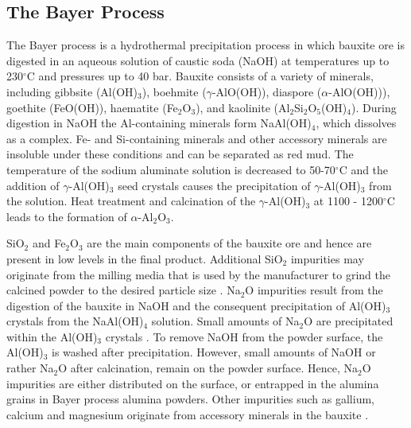 \subsection{The Bayer Process}

The Bayer process is a hydrothermal precipitation process in which bauxite ore is digested in an aqueous solution of caustic soda (NaOH) at temperatures up to 230$^{\circ}$C and pressures up to 40 bar. Bauxite consists of a variety of minerals, including gibbsite (Al(OH)$_{3}$), boehmite ($\gamma$-AlO(OH)), diaspore ($\alpha$-AlO(OH))), goethite (FeO(OH)), haematite (Fe$_{2}$O$_{3}$), and kaolinite (Al$_{2}$Si$_{2}$O$_{5}$(OH)$_{4}$). During digestion in NaOH the Al-containing minerals form NaAl(OH)$_{4}$, which dissolves as a complex. Fe- and Si-containing minerals and other accessory minerals are insoluble under these conditions and can be separated as red mud. The temperature of the sodium aluminate solution is decreased to 50-70$^{\circ}$C and the addition of $\gamma$-Al(OH)$_{3}$ seed crystals causes the precipitation of $\gamma$-Al(OH)$_{3}$ from the solution. Heat treatment and calcination of the $\gamma$-Al(OH)$_{3}$ at 1100 - 1200$^{\circ}$C leads to the formation of $\alpha$-Al$_{2}$O$_{3}$.

SiO$_{2}$ and Fe$_{2}$O$_{3}$ are the main components of the bauxite ore and hence are present in low levels in the final product. Additional SiO$_{2}$ impurities may originate from the milling media that is used by the manufacturer to grind the calcined powder to the desired particle size \cite{Compson2013,Bennison1990}. Na$_{2}$O impurities result from the digestion of the bauxite in NaOH and the consequent precipitation of Al(OH)$_{3}$ crystals from the NaAl(OH)$_{4}$ solution. Small amounts of Na$_{2}$O are precipitated within the Al(OH)$_{3}$ crystals \cite{Compson2013}. To remove NaOH from the powder surface, the Al(OH)$_{3}$ is washed after precipitation. However, small amounts of NaOH or rather Na$_{2}$O after calcination, remain on the powder surface. Hence, Na$_{2}$O impurities are either distributed on the surface, or entrapped in the alumina grains in Bayer process alumina powders. Other impurities such as gallium, calcium and magnesium originate from accessory minerals in the bauxite \cite{Bennison1990}.

